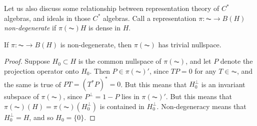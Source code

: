 Let us also discuss some relationship between representation theory of $C^*$ algebras, and ideals in those $C^*$ algebras. Call a representation $\pi: \AC \to B(H)$ \emph{non-degenerate} if $\pi(\AC) H$ is dense in $H$.

\begin{lemma}
    If $\pi: \AC \to B(H)$ is non-degenerate, then $\pi(\AC)$ has trivial nullspace.
\end{lemma}
\begin{proof}
    Suppose $H_0 \subset H$ is the common nullspace of $\pi(\AC)$, and let $P$ denote the projection operator onto $H_0$. Then $P \in \pi(\AC)'$, since $TP = 0$ for any $T \in \AC$, and the same is true of $PT = (T^* P)^* = 0$. But this means that $H_0^\perp$ is an invariant subspace of $\pi(\AC)$, since $P^\perp = 1 - P$ lies in $\pi(\AC)'$. But this means that $\pi(\AC)(H) = \pi(\AC)(H_0^\perp)$ is contained in $H_0^\perp$. Non-degeneracy means that $H_0^\perp = H$, and so $H_0 = \{ 0 \}$.
\end{proof}

